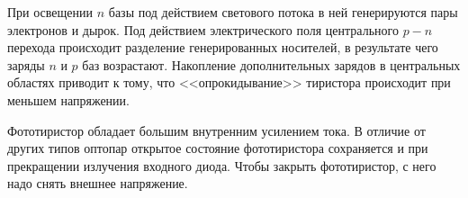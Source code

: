 При освещении $n$ базы под действием светового потока в ней генерируются пары электронов и дырок. Под действием электрического поля центрального $p-n$ перехода происходит разделение генерированных носителей, в результате чего заряды $n$ и $p$ баз возрастают. Накопление дополнительных зарядов в центральных областях приводит к тому, что <<опрокидывание>> тиристора происходит при меньшем напряжении.

Фототиристор обладает большим внутренним усилением тока. В отличие от других типов оптопар открытое состояние фототиристора сохраняется и при прекращении излучения входного диода. Чтобы закрыть фототиристор, с него надо снять внешнее напряжение.